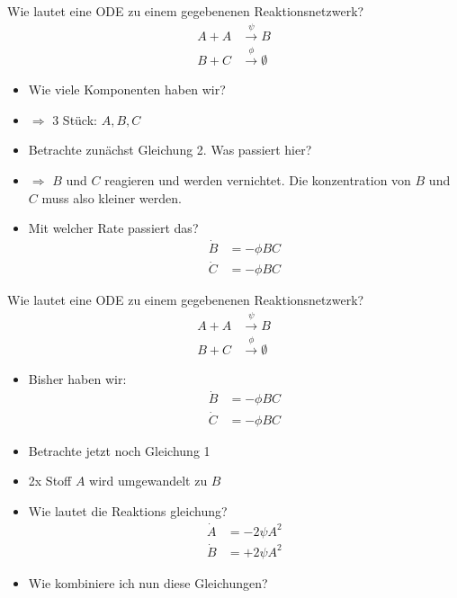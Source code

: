 \begin{frame}[fragile]
    Wie lautet eine ODE zu einem gegebenenen Reaktionsnetzwerk?
    \begin{align}
        A+A&\xrightarrow{\psi}B\\
        B+C&\xrightarrow{\phi}\emptyset
    \end{align}
    \begin{itemize}[<+->]
        \item Wie viele Komponenten haben wir?
        \item[ ] $\Rightarrow$ 3 Stück: $A, B, C$
        \item Betrachte zunächst Gleichung 2. Was passiert hier?
        \item[ ] $\Rightarrow$ $B$ und $C$ reagieren und werden vernichtet. 
        Die konzentration von $B$ und $C$ muss also kleiner werden.
        \item Mit welcher Rate passiert das?
        \pause \begin{align}
            \dot{B} &= -\phi BC\\
            \dot{C} &= -\phi BC
        \end{align}
    \end{itemize}
\end{frame}


\begin{frame}[fragile]
    Wie lautet eine ODE zu einem gegebenenen Reaktionsnetzwerk?
    \begin{align}
        A+A&\xrightarrow{\psi}B\\
        B+C&\xrightarrow{\phi}\emptyset
    \end{align}
    \begin{itemize}[<+->]
        \item Bisher haben wir:
        \pause \begin{align}
            \dot{B} &= -\phi BC\\
            \dot{C} &= -\phi BC
        \end{align}
        \item Betrachte jetzt noch Gleichung 1
        \item[ ] 2x Stoff $A$ wird umgewandelt zu $B$
        \item Wie lautet die Reaktions gleichung?
        \pause
        \begin{align}
            \dot{A} &= -2\psi A^2\\
            \dot{B} &= +2\psi A^2
        \end{align}
        \item Wie kombiniere ich nun diese Gleichungen?
    \end{itemize}
\end{frame}


